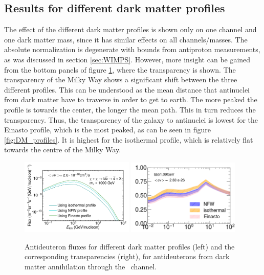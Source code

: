 \subsection{Results for different dark matter profiles}\label{sec:ResDMProfiles}
The effect of the different dark matter profiles is shown only on one channel and one dark matter mass, since it has similar effects on all channels/masses. The absolute normalization is degenerate with bounds from antiproton measurements, as was discussed in section \ref{sec:WIMPS}. However, more insight can be gained from the bottom panels of figure \ref{fig:different_DM_profiles_and_transparencies}, where the transparency is shown. The transparency of the Milky Way shows a significant shift between the three different profiles. This can be understood as the mean distance that antinuclei from dark matter have to traverse in order to get to earth. The more peaked the profile is towards the center, the longer the mean path. This in turn reduces the transparency. Thus, the transparency of the galaxy to antinuclei is lowest for the Einasto profile, which is the most peaked, as can be seen in figure \ref{fig:DM_profiles}. It is highest for the isothermal profile, which is relatively flat towards the centre of the Milky Way. 

\begin{figure}[hbtp]
    \centering
    \includegraphics[width=0.48\textwidth]{figures/bbdbarPaperLISDiffProfiles.pdf}
    \includegraphics[width=0.48\textwidth]{figures/Transparency_comparison_DM_profiles_bb51GeV_DMXs_option_nominal.png}
    \caption{Antideuteron fluxes for different dark matter profiles (left) and the corresponding transparencies (right), for antideuterons from dark matter annihilation through the \bb\ channel.}
    \label{fig:different_DM_profiles_and_transparencies}
\end{figure}


